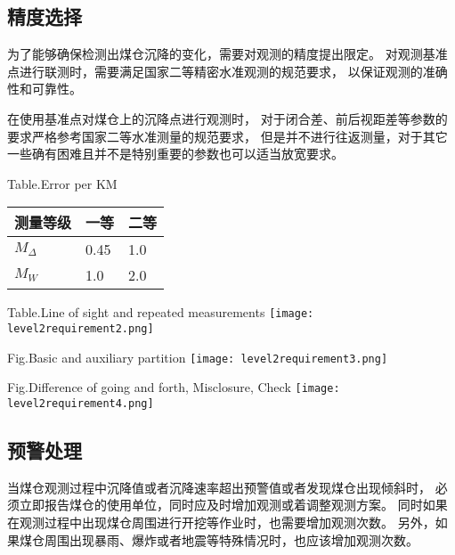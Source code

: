 \subsection{精度选择}
为了能够确保检测出煤仓沉降的变化，需要对观测的精度提出限定。
对观测基准点进行联测时，需要满足国家二等精密水准观测的规范要求，
以保证观测的准确性和可靠性。

在使用基准点对煤仓上的沉降点进行观测时，
对于闭合差、前后视距差等参数的要求严格参考国家二等水准测量的规范要求，
但是并不进行往返测量，对于其它一些确有困难且并不是特别重要的参数也可以适当放宽要求。
\begin{table}[!htbp]
\begin{center}
			{Table.}{Error per KM}
\begin{tabularx}{15cm}{XXX}
\toprule
测量等级     &  一等     & 二等	 \\
\midrule
$M_\Delta$   &  0.45     & 1.0    \\
$M_W$     	 &  1.0      & 2.0    \\
\bottomrule
\end{tabularx}
\end{center}
\end{table}

\begin{table}[!htbp]
\begin{center}
			{Table.}{Line of sight and repeated measurements}
\texttt{[image: level2requirement2.png]}
\end{center}
\end{table}

\begin{table}[!htbp]
   \centering
			{Fig.}{Basic and auxiliary partition}
   \texttt{[image: level2requirement3.png]}
\end{table}

\begin{table}[!htbp]
   \centering
			{Fig.}{Difference of going and forth, Misclosure, Check}
   \texttt{[image: level2requirement4.png]}
\end{table}

\subsection{预警处理}
当煤仓观测过程中沉降值或者沉降速率超出预警值或者发现煤仓出现倾斜时，
必须立即报告煤仓的使用单位，同时应及时增加观测或着调整观测方案。
同时如果在观测过程中出现煤仓周围进行开挖等作业时，也需要增加观测次数。
另外，如果煤仓周围出现暴雨、爆炸或者地震等特殊情况时，也应该增加观测次数。



